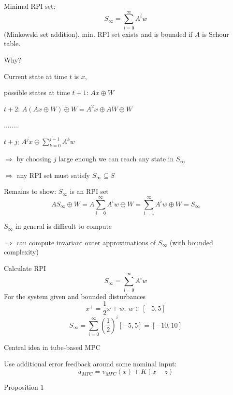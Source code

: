 Minimal RPI set:
\begin{equation*}
S_{\infty} = \sum_{i = 0}^{\infty} A^iw
\end{equation*}
(Minkowski set addition), min. RPI set exists and is bounded if $A$ is Schour table.

Why?

Current state at time $t$ is $x$,

possible states at time $t+1$: $Ax \oplus W$
                        
$t+2$: $A(Ax \oplus W) \oplus W = A^2x \oplus AW \oplus W$
  
       ........
        
$t+j$: $A^jx \oplus \sum_{k=0}^{j-1}A^kw$

$\Rightarrow$ by choosing $j$ large enough we can reach any state in $S_{\infty}$

$\Rightarrow$ any RPI set must satisfy $S_{\infty} \subseteq S$

Remains to show: $S_{\infty}$ is an RPI set
\begin{equation*}
AS_{\infty} \oplus W = A\sum_{i=0}^{\infty}A^iw \oplus W = \sum_{i=1}^{\infty}A^iw \oplus W = S_{\infty} 
\end{equation*}

$S_{\infty}$ in  general is difficult to compute 

$\Rightarrow$ can compute invariant outer approximations of $S_{\infty}$ (with bounded complexity)

\begin{Example} 

Calculate RPI 
\begin{equation*}
S_{\infty} = \sum_{i=0}^{\infty} A^iw
\end{equation*}
For the system given and bounded disturbances
\begin{equation*}
x^+=\frac{1}{2}x + w, \ w \in [-5,5]
\end{equation*}
\begin{equation*}
S_{\infty} = \sum_{i=0}^{\infty}(\frac{1}{2})^i [-5,5] = [-10, 10]
\end{equation*}
\end{Example}

Central idea in tube-based MPC

Use additional error feedback around some nominal input:
\begin{equation*}
u_{MPC} = v_{MPC}(x) + K (x - z)
\end{equation*}

Proposition 1


